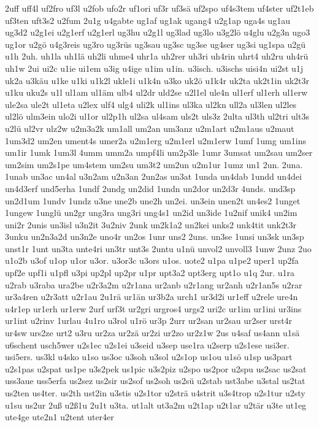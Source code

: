 {2uff
uff4l
uf2fro
uf3l
u2fob
ufo2r
uf1ori
uf3r
uf3sä
uf2spo
uf4s3tem
uf4ster
uf2t1eb
uf3ten
uft3s2
u2fum
2u1g
u4gabte
ug1af
ug1ak
ugang4
u2g1ap
uga4s
ug1au
ug3d2
u2g1ei
u2g1erf
u2g1erl
ug3hu
u2g1l
ug3lad
ug3lo
u3g2lö
u4glu
u2g3n
ugo3
ug1or
u2gö
u4g3reis
ug3ro
ug3rüs
ug3sau
ug3sc
ug3se
ug4ser
ug3si
ug1spa
u2gü
u1h
2uh.
uh1la
uh1lä
uh2li
uhme4
uhr1a
uh2rer
uh3ri
uh4rin
uhrt4
uh2ru
uh4rü
uh1w
2ui
ui2c
u1ie
ui1em
u3ig
u4ige
u1im
u1in.
u3isch.
u3ischs
uisi4n
ui2st
u1j
uk2a
u3käu
u1ke
u1ki
u1k2l
ukle1i
u1k4n
u3ko
uk2ö
u1k4r
uk2ta
uk2t1in
uk2t3r
u1ku
uku2s
u1l
ul1am
ul1äm
ulb4
ul2dr
uld2se
u2l1el
ule4n
ul1erf
ul1erh
ul1erw
ule2sa
ule2t
ul1eta
u2lex
ulf4
ulg4
uli2k
ul1ins
ul3ka
ul2kn
ull2a
ul3len
ul2les
ul2lö
ulm3ein
ulo2i
ul1or
ul2p1h
ul2sa
ul4sam
uls2t
uls3z
2ulta
ul3th
ul2tri
ult3s
u2lü
ul2vr
ulz2w
u2m3a2k
um1all
um2an
um3anz
u2m1art
u2m1aus
u2maut
1um3d2
um2en
ument4s
umer2a
u2m1erg
u2m1erl
u2m1erw
1umf
1umg
um1ins
um1ir
1umk
1um3l
4umm
umm2a
umpf4li
um2p3le
1umr
3umsat
um2sau
um2ser
um2sim
um2s1pe
um4stem
um2su
um3t2
um2un
u2m1ur
1umz
un1
2un.
2una.
1unab
un3ac
un4al
u3n2am
u2n3an
2un2as
un3at
1unda
un4dab
1undd
un4dei
un4d3erf
und5erha
1undf
2undg
un2did
1undn
un2dor
un2d3r
4unds.
und3sp
un2d1um
1undv
1undz
u3ne
une2b
une2h
un2ei.
un3ein
unen2t
un4es2
1unget
1ungew
1unglü
un2gr
ung3ra
ung3ri
ung4s1
un2id
un3ide
1u2nif
unik4
un2im
uni2r
2unis
un3isl
u3n2it
3u2niv
2unk
un2k1a2
un2kei
unks2
unk4tit
unk2t3r
3unku
un2n3a2d
un3n2e
uno4r
un2os
1unr
uns2
2uns.
un3se
1unsi
un3sk
un3sp
unst1r
1unt
un3ta
unte4ri
un3tr
unt3s
2untu
u1nü
unvol2
unvoll3
1unw
2unz
2uo
u1o2b
u3of
u1op
u1or
u3or.
u3or3c
u3ors
u1os.
uote2
u1pa
u1pe2
uper1
up2fa
upf2e
upf1i
u1pfl
u3pi
up2pl
up2pr
u1pr
upt3a2
upt3erg
upt1o
u1q
2ur.
u1ra
u2rab
u3raba
ura2be
u2r3a2m
u2r1ana
ur2anb
u2r1ang
ur2anh
u2r1an5s
u2rar
ur3a4ren
u2r3att
u2r1au
2u1rä
ur1än
ur3b2a
urch1
ur3d2i
ur1eff
u2rele
ure4n
u4r1ep
ur1erh
ur1erw
2urf
urf3t
ur2gri
urgros4
urgs2
uri2c
ur1im
ur1ini
ur3ins
ur1int
u2rinv
1urlau
4u1ro
u3rol
u1rö
ur3p
2urr
ur2san
ur2sau
ur2ser
urst4r
ur4sw
urs2ze
urt2
u3ru
ur2za
ur2zä
ur2zi
ur2zo
ur2z1w
2us
u4saf
us4ann
u1sä
u6schent
usch5wer
u2s1ec
u2s1ei
u3seid
u3sep
use1ra
u2serp
u2s1ese
usi3er.
usi5ers.
us3kl
u4sko
u1so
us3oc
u3soh
u3sol
u2s1op
us1ou
u1sö
u1sp
us3part
u2s1pas
u2spat
us1pe
u3s2pek
us1pic
u3s2piz
u2spo
us2por
u2spu
us2sac
us2sat
uss3aue
uss5erfa
us2sez
us2sir
us2sof
us2soh
us2sü
u2stab
ust3abe
u3stal
us2tat
us2ten
us4ter.
us2th
ust2in
u3stis
u2s1tor
u2strä
u4strit
u3s4trop
u2s1tur
u2sty
u1su
us2ur
2uß
u2ß1u
2u1t
u3ta.
ut1alt
ut3a2m
u2t1ap
u2t1ar
u2tär
u3te
ut1eg
ute4ge
ute2n1
u2tent
uter4er
}
